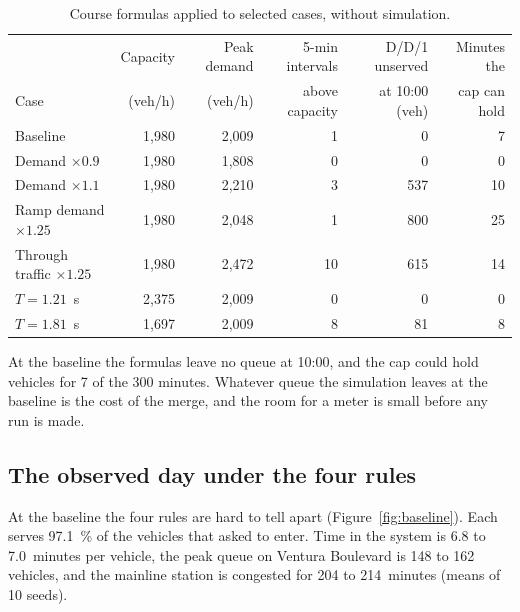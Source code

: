 \documentclass[11pt,letterpaper]{article}
\begin{document}
\begin{table}[!htb]
\centering
\setlength{\tabcolsep}{4pt}
\caption{Course formulas applied to selected cases, without simulation.}
\label{tab:formulas}
\begin{tabular}{lrrrrr}
\toprule
 & Capacity & Peak demand & 5-min intervals & D/D/1 unserved & Minutes the\\
Case & (veh/h) & (veh/h) & above capacity & at 10:00 (veh) & cap can hold\\
\midrule
Baseline & 1,980 & 2,009 & 1 & 0 & 7\\
Demand $\times0.9$ & 1,980 & 1,808 & 0 & 0 & 0\\
Demand $\times1.1$ & 1,980 & 2,210 & 3 & 537 & 10\\
Ramp demand $\times1.25$ & 1,980 & 2,048 & 1 & 800 & 25\\
Through traffic $\times1.25$ & 1,980 & 2,472 & 10 & 615 & 14\\
$T=1.21$~s & 2,375 & 2,009 & 0 & 0 & 0\\
$T=1.81$~s & 1,697 & 2,009 & 8 & 81 & 8\\
\bottomrule
\end{tabular}
\end{table}

At the baseline the formulas leave no queue at 10:00, and the cap could hold vehicles
for 7 of the 300 minutes. Whatever queue the simulation leaves at the baseline is the
cost of the merge, and the room for a meter is small before any run is made.

\FloatBarrier
\subsection{The observed day under the four rules}

At the baseline the four rules are hard to tell apart (Figure~\ref{fig:baseline}). Each
serves 97.1~\% of the vehicles that asked to enter. Time in the system is 6.8 to
7.0~minutes per vehicle, the peak queue on Ventura Boulevard is 148 to 162 vehicles, and
the mainline station is congested for 204 to 214~minutes (means of 10 seeds).
\end{document}
